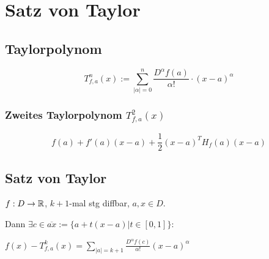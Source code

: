 \section*{Satz von Taylor}

\subsection*{Taylorpolynom}
\[T_{f,a}^n(x) := \sum_{|\alpha| = 0}^{n}\frac{D^\alpha f(a)}{\alpha!} \cdot (x - a)^{\alpha}\]

\subsubsection*{Zweites Taylorpolynom $T_{f,a}^2(x)$}
\[f(a) + f'(a)(x-a) + \frac{1}{2}(x-a)^T H_f(a) (x-a)\]

\subsection*{Satz von Taylor}
$f:D\to\mathbb{R}$, $k+1$-mal stg diffbar, $a,x\in D$.

Dann $\exists c \in \overline{ax}:=\{a+t(x-a) | t \in [0,1]\}:$

$f(x) - T^k_{f,a}(x) = \sum_{|a|=k+1}\frac{D^\alpha f(c)}{\alpha!}(x-a)^\alpha$
